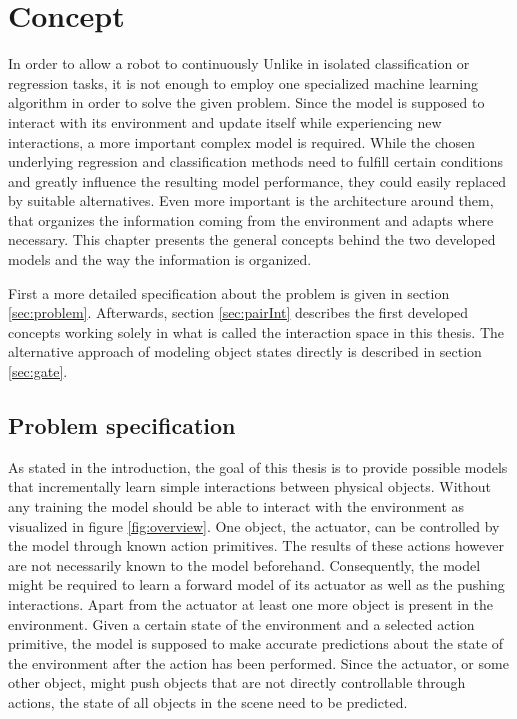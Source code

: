 \chapter{Concept \label{chap:concept}}


In order to allow a robot to continuously %
Unlike in isolated classification or regression tasks, it is not enough to employ one specialized machine learning algorithm in order to solve the given problem. Since the model is supposed to interact with its environment and update itself while experiencing new interactions, a more important complex model is required. While the chosen underlying regression and classification methods need to fulfill certain conditions and greatly influence the resulting model performance, they could easily replaced by suitable alternatives. Even more important is the architecture around them, that organizes the information coming from the environment and adapts where necessary. This chapter presents the general concepts behind the two developed models and the way the information is organized.

First a more detailed specification about the problem is given in section \ref{sec:problem}. Afterwards,
section \ref{sec:pairInt} describes the first developed concepts working solely in what is called the interaction space in this thesis. The alternative approach of modeling object states directly is described in section \ref{sec:gate}.

\section{Problem specification \label{sec:problem}}

As stated in the introduction, the goal of this thesis is to provide possible models that incrementally learn simple interactions between physical objects. Without any training the model should be able to interact with the environment as visualized in figure \ref{fig:overview}. %
One object, the actuator, can be controlled by the model through known action primitives. The results of these actions however are not necessarily known to the model beforehand. Consequently, the model might be required to learn a forward model of its actuator as well as the pushing interactions. Apart from the actuator at least one more object is present in the environment. Given a certain state of the environment and a selected action primitive, the model is supposed to make accurate predictions about the state of the environment after the action has been performed. Since the actuator, or some other object, might push objects that are not directly controllable through actions, the state of all objects in the scene need to be predicted. 

